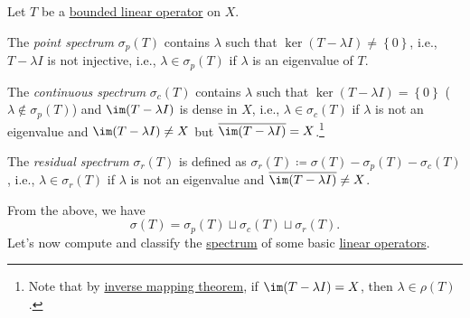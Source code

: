 \begin{definition*}
	Let \(T\) be a \hyperref[def:bounded-linear-op]{bounded linear operator} on \(X\).
	\begin{definition}\label{def:point-spectrum}
		The \emph{point spectrum} \(\sigma _p(T)\) contains \(\lambda \) such that \(\ker(T - \lambda I) \neq \left\{ 0 \right\} \), i.e., \(T - \lambda I\) is not injective, i.e., \(\lambda \in \sigma _p(T)\) if \(\lambda \) is an eigenvalue of \(T\).
	\end{definition}
	\begin{definition}\label{def:continuous-spectrum}
		The \emph{continuous spectrum} \(\sigma _c(T)\) contains \(\lambda \) such that \(\ker(T - \lambda I) = \left\{ 0 \right\} \) (\(\lambda \notin \sigma _p(T)\)) and \(\im(T-\lambda I)\) is dense in \(X\), i.e., \(\lambda \in \sigma _c(T)\) if \(\lambda \) is not an eigenvalue and \(\im(T-\lambda I)\neq X\) but \(\overline{\im(T-\lambda I)}=X\).\footnote{Note that by \hyperref[thm:inverse-mapping]{inverse mapping theorem}, if \(\im(T - \lambda I)=X\), then \(\lambda \in \rho (T)\).}
	\end{definition}
	\begin{definition}\label{def:residual-spectrum}
		The \emph{residual spectrum} \(\sigma _r(T)\) is defined as \(\sigma _r(T)\coloneqq \sigma (T) - \sigma _p(T) - \sigma _c(T)\), i.e., \(\lambda \in \sigma _r(T)\) if \(\lambda \) is not an eigenvalue and \(\overline{\im(T-\lambda I)}\neq X\).
	\end{definition}
\end{definition*}

From the above, we have
\[
	\sigma (T) = \sigma _p (T) \sqcup \sigma _c(T) \sqcup \sigma _r(T).
\]
Let's now compute and classify the \hyperref[def:spectrum-point]{spectrum} of some basic \hyperref[def:linear-op]{linear operators}.


